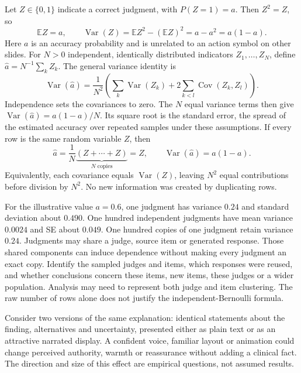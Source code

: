 Let $Z\in\{0,1\}$ indicate a correct judgment, with $P(Z=1)=a$. Then $Z^2=Z$, so
\[
\mathbb E Z=a,\qquad
\operatorname{Var}(Z)=\mathbb E Z^2-(\mathbb E Z)^2=a-a^2=a(1-a).
\]
Here $a$ is an accuracy probability and is unrelated to an action symbol on other slides.
For $N>0$ independent, identically distributed indicators $Z_1,\ldots,Z_N$, define $\hat a=N^{-1}\sum_k Z_k$. The general variance identity is
\[
\operatorname{Var}(\hat a)=\frac1{N^2}
\left(\sum_k\operatorname{Var}(Z_k)+2\sum_{k<l}\operatorname{Cov}(Z_k,Z_l)\right).
\]
Independence sets the covariances to zero. The $N$ equal variance terms then give $\operatorname{Var}(\hat a)=a(1-a)/N$. Its square root is the standard error, the spread of the estimated accuracy over repeated samples under these assumptions.
If every row is the same random variable $Z$, then
\[
\hat a=\frac1N\underbrace{(Z+\cdots+Z)}_{N\text{ copies}}=Z,
\qquad \operatorname{Var}(\hat a)=a(1-a).
\]
Equivalently, each covariance equals $\operatorname{Var}(Z)$, leaving $N^2$ equal contributions before division by $N^2$. No new information was created by duplicating rows.

For the illustrative value $a=0.6$, one judgment has variance $0.24$ and standard deviation about $0.490$. One hundred independent judgments have mean variance $0.0024$ and SE about $0.049$. One hundred copies of one judgment retain variance $0.24$.
Judgments may share a judge, source item or generated response. Those shared components can induce dependence without making every judgment an exact copy. Identify the sampled judges and items, which responses were reused, and whether conclusions concern these items, new items, these judges or a wider population. Analysis may need to represent both judge and item clustering. The raw number of rows alone does not justify the independent-Bernoulli formula.

\biomedicalanswer
{}
Consider two versions of the same explanation: identical statements about the finding, alternatives and uncertainty, presented either as plain text or as an attractive narrated display. A confident voice, familiar layout or animation could change perceived authority, warmth or reassurance without adding a clinical fact. The direction and size of this effect are empirical questions, not assumed results.

